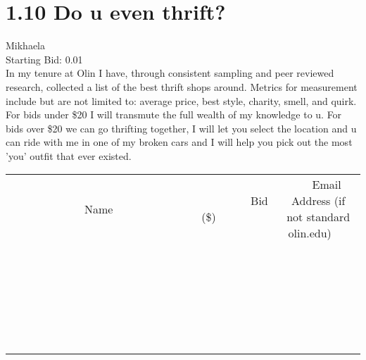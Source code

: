 \documentclass[11pt]{article}
\begin{document}
					\section*{1.10 Do u even thrift?}
					Mikhaela \\
					Starting Bid: 0.01 \\
					In my tenure at Olin I have, through consistent sampling and peer reviewed research, collected a list of the best thrift shops around. Metrics for measurement include but are not limited to: average price, best style, charity, smell, and quirk. For bids under \$20 I will transmute the full wealth of my knowledge to u. For bids over \$20 we can go thrifting together, I will let you select the location and u can ride with me in one of my broken cars and I will help you pick out the most 'you' outfit that ever existed. \\
					[6ex]
					\begin{tabular}{c c c}
						~~~~~~~~~~~~~Name~~~~~~~~~~~~~ & ~~~~~~~~~Bid (\$)~~~~~~~~~ & ~~~Email Address (if not standard olin.edu)~~~ \\
				
 & & \\
\hline
 & & \\
\hline
 & & \\
\hline
 & & \\
\hline
 & & \\
\hline
 & & \\
\hline
 & & \\
\hline
 & & \\
\hline
 & & \\
\hline
 & & \\
\hline
 & & \\
\hline
 & & \\
\hline
 & & \\
\hline
 & & \\
\hline
 & & \\
\hline
 & & \\
\hline
 & & \\
\hline
 & & \\
\hline
 & & \\
\hline
 & & \\
\hline
 & & \\
\hline
 & & \\
\hline
 & & \\
\hline
 & & \\
\hline
 & & \\
\hline
 & & \\
\hline
					\end{tabular}
					\clearpage
				
\end{document}
